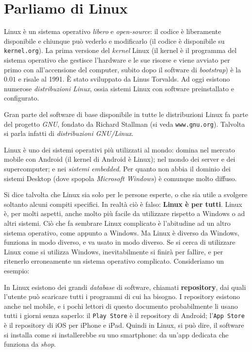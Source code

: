 \section{Parliamo di Linux}
Linux è un sistema operativo \textit{libero} e \textit{open-source}: il codice è liberamente disponibile e chiunque può vederlo e modificarlo (il codice è disponibile su \texttt{kernel.org}). La prima versione del \textit{kernel} Linux (il kernel è il programma del sistema operativo che gestisce l'hardware e le sue risorse e viene avviato per primo con all'accensione del computer, subito dopo il software di \textit{bootstrap}) è la \(0.01\) e risale al 1991. È stato sviluppato da Linus Torvalds. Ad oggi esistono numerose \textit{distribuzioni Linux}, ossia sistemi Linux con software preinstallato e configurato.

Gran parte del software di base disponibile in tutte le distribuzioni Linux fa parte del progetto \textit{GNU}, fondato da Richard Stallman (si veda \texttt{www.gnu.org}). Talvolta si parla infatti di \textit{distribuzioni GNU/Linux}.

Linux è uno dei sistemi operativi più utilizzati al mondo: domina nel mercato mobile con Android (il kernel di Android è Linux); nel mondo dei server e dei supercomputer; e nei \textit{sistemi embedded}. Per quanto non abbia il dominio dei sistemi Desktop (dove spopola \textit{Microsoft Windows}) è comunque molto diffuso.

Si dice talvolta che Linux sia solo per le persone esperte, o che sia utile a svolgere soltanto alcuni compiti specifici. In realtà ciò è falso: \textbf{Linux è per tutti}. Linux è, per molti aspetti, anche molto più facile da utilizzare rispetto a Windows o ad altri sistemi. Ciò che fa sembrare Linux complicato è l'abitudine ad un altro sistema operativo, come appunto a Windows. Ma Linux è diverso da Windows, funziona in modo diverso, e va usato in modo diverso. Se si cerca di utilizzare Linux come si utilizza Windows, inevitabilmente si finirà per fallire, e per ritenerlo erroneamente un sistema operativo complicato. Consideriamo un esempio:

In Linux esistono dei grandi \textit{database} di software, chiamati \textbf{repository}, dai quali l'utente può scaricare tutti i programmi di cui ha bisogno. I repository esistono anche nel mobile, e i pochi lettori di questo documento probabilmente li usano tutti i giorni senza saperlo: il \texttt{Play Store} è il repository di Android; l'\texttt{App Store} è il repository di iOS per iPhone e iPad. Quindi in Linux, si può dire, il software si installa come si installerebbe su uno smartphone: da un'app dedicata che funziona da \textit{shop}.

